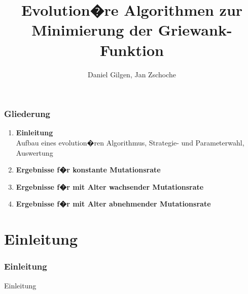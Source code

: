 \documentclass[]{beamer}
\begin{document}
\beamertemplatenavigationsymbolsempty

\title[EvoAlg]{Evolution�re Algorithmen zur Minimierung der Griewank-Funktion}   
\author[D. Gilgen, J.Zschoche]{Daniel Gilgen, Jan Zschoche}
\date[Leipzig, 2016]{}

\begin{frame}
    \titlepage
\end{frame}

\begin{frame}\frametitle{Gliederung}
    \vspace{1cm}
    \begin{enumerate}
	\item \textbf{\large Einleitung}\\
		Aufbau eines evolution�ren Algorithmus, Strategie- und Parameterwahl, Auswertung \\[0.4cm]
	\item \textbf{\large Ergebnisse f�r konstante Mutationsrate}\\[0.4cm]
	\item \textbf{\large Ergebnisse f�r mit Alter wachsender Mutationsrate}\\[0.4cm]
	\item \textbf{\large Ergebnisse f�r mit Alter abnehmender Mutationsrate}\\
    \end{enumerate}
\end{frame}


\section{Einleitung} 

\begin{frame}\frametitle{Einleitung} 
	
	\begin{center}
		\LARGE{Einleitung}	
	\end{center}
	
\end{frame}
\end{document}
